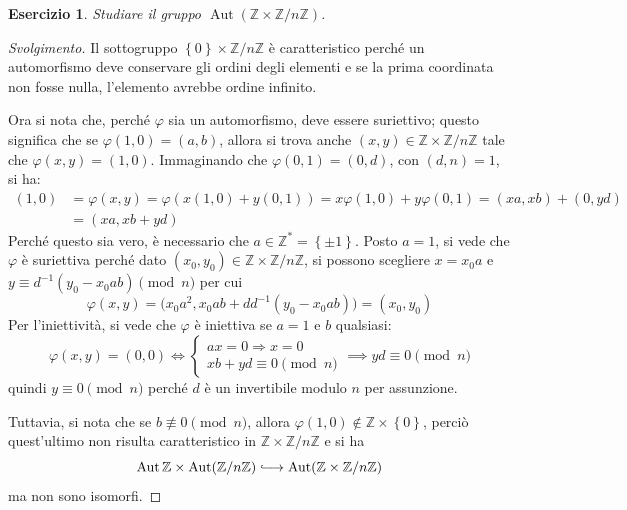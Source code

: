\documentclass[11pt]{article}
\theoremstyle{style}
\newtheorem{esercizio}{Esercizio}[section]
\newenvironment{svolgimento}{\renewcommand\qedsymbol{$\blacksquare$}\begin{proof}[Svolgimento]}{\end{proof}}
\numberwithin{equation}{subsection}
\newcommand{\longhookrightarrow}{\lhook\joinrel\longrightarrow}
\begin{document}
\begin{esercizio}
Studiare il gruppo $\operatorname{Aut} ( \mathbb{Z}\times \mathbb{Z}/n\mathbb{Z})$.
\end{esercizio}
\begin{svolgimento}
	Il sottogruppo $\left\{ 0 \right\} \times \mathbb{Z}/n\mathbb{Z}$ \`e caratteristico perch\'e un automorfismo deve conservare gli ordini degli elementi e se la prima coordinata non fosse nulla, l'elemento avrebbe ordine infinito.

	Ora si nota che, perch\'e $\varphi $ sia un automorfismo, deve essere suriettivo; questo significa che se $\varphi (1,0) = (a,b)$, allora si trova anche $(x,y) \in \mathbb{Z}\times \mathbb{Z}/n\mathbb{Z}$ tale che $\varphi (x,y) = (1,0)$. Immaginando che $\varphi (0,1) = (0,d)$, con $(d,n) = 1$, si ha:
	\[
		\begin{split}
			(1,0) &= \varphi (x,y) = \varphi (x (1,0) + y (0,1)) = x\varphi (1,0) + y \varphi (0,1) = (xa,xb) + (0,yd)\\
													       &= (xa, xb + yd)
		\end{split}
	\] 
	Perch\'e questo sia vero, \`e necessario che $a \in \mathbb{Z}^* = \left\{ \pm 1 \right\} $.
Posto $a = 1$, si vede che $\varphi $ \`e suriettiva perch\'e dato $(x_0,y_0) \in \mathbb{Z}\times \mathbb{Z}/n\mathbb{Z}$, si possono scegliere $x = x_0 a$ e $y \equiv d^{-1}(y_0 - x_0 ab)\pmod{n} $ per cui
\[
\varphi (x,y) = \big(x_0a^{2} ,x_0 ab +dd^{-1}(y_0-x_0ab)\big)=(x_0,y_0)
\] 
	Per l'iniettivit\`a, si vede che $\varphi $ \`e iniettiva se $a=1$ e $b$ qualsiasi:
	\[
	\varphi (x,y) = (0,0) \iff \begin{cases}
		ax = 0\Rightarrow x=0 \\
		xb + yd \equiv 0 \pmod{n} 
	\end{cases}\implies yd \equiv 0 \pmod{n}
	\] 
	quindi $y \equiv 0 \pmod{n} $ perch\'e $d$ \`e un invertibile modulo $n$ per assunzione.

	Tuttavia, si nota che se $b \not \equiv 0 \pmod{n} $, allora $\varphi (1,0)\not\in \mathbb{Z}\times \left\{ 0 \right\} $, perci\`o quest'ultimo non risulta caratteristico in $\mathbb{Z}\times \mathbb{Z}/n\mathbb{Z}$ e si ha 
	\[
	\operatorname{Aut} \mathbb{Z} \times \operatorname{Aut} (\mathbb{Z}/n\mathbb{Z}) \longhookrightarrow \operatorname{Aut} (\mathbb{Z}\times \mathbb{Z}/n\mathbb{Z})
	\] 
	ma non sono isomorfi.
\end{svolgimento}
\end{document}
